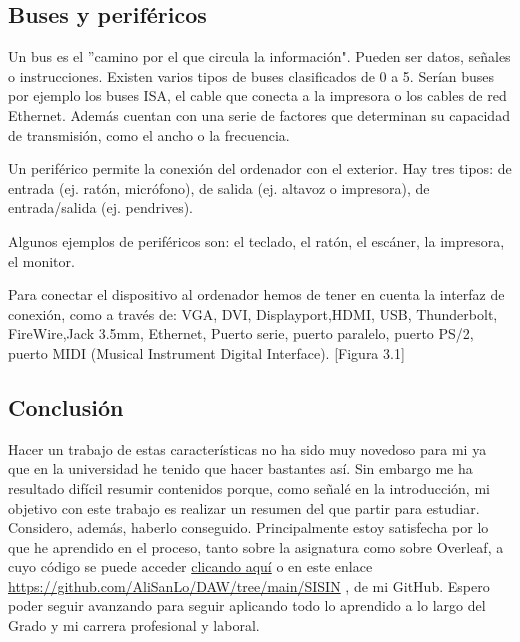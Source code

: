 \documentclass{book}
\begin{document}
\subsection{\textbf{Buses y periféricos}}
\begin{large}
    Un bus es el ''camino por el que circula la información". Pueden ser datos, señales o instrucciones. Existen varios tipos de buses clasificados de 0 a 5. Serían buses por ejemplo los buses ISA, el cable que conecta a la impresora o los cables de red Ethernet. Además cuentan con una serie de factores que determinan su capacidad de transmisión, como el ancho o la frecuencia.

    Un periférico permite la conexión del ordenador con el exterior. Hay tres tipos: de entrada (ej. ratón, micrófono), de salida (ej. altavoz o impresora), de entrada/salida (ej. pendrives).

    Algunos ejemplos de periféricos son: el teclado, el ratón, el escáner, la impresora, el monitor.

    Para conectar el dispositivo al ordenador hemos de tener en cuenta la interfaz de conexión, como a través de: VGA, DVI, Displayport,HDMI, USB, Thunderbolt, FireWire,Jack 3.5mm, Ethernet, Puerto serie, puerto paralelo, puerto PS/2, puerto MIDI (Musical Instrument Digital Interface). [Figura 3.1]

\end{large}

\subsection{\textbf{Conclusión}}

\begin{large}

    Hacer un trabajo de estas características no ha sido muy novedoso para mi ya que en la universidad he tenido que hacer bastantes así. Sin embargo me ha resultado difícil resumir contenidos porque, como señalé en la introducción, mi objetivo con este trabajo es realizar un resumen del que partir para estudiar. Considero, además, haberlo conseguido. Principalmente estoy satisfecha por lo que he aprendido en el proceso, tanto sobre la asignatura como sobre Overleaf, a cuyo código se puede acceder  \href{https://github.com/AliSanLo/DAW/tree/main/SISIN}{clicando aquí} o en este enlace \url {https://github.com/AliSanLo/DAW/tree/main/SISIN} , de mi GitHub. Espero poder seguir avanzando para seguir aplicando todo lo aprendido a lo largo del Grado y mi carrera profesional y laboral.



\end{large}
\end{document}
